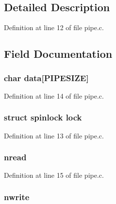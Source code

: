 \subsection{Detailed Description}


Definition at line 12 of file pipe.\-c.



\subsection{Field Documentation}
\hypertarget{structpipe_a4b9a650598bf6f6eff13ff36793ec4f4}{
\subsubsection[{data}]{\setlength{\rightskip}{0pt plus 5cm}char data\mbox{[}{\bf P\-I\-P\-E\-S\-I\-Z\-E}\mbox{]}}}\label{structpipe_a4b9a650598bf6f6eff13ff36793ec4f4}


Definition at line 14 of file pipe.\-c.

\hypertarget{structpipe_ab28e82cd5dda7d960095706a3ea20572}{
\subsubsection[{lock}]{\setlength{\rightskip}{0pt plus 5cm}struct {\bf spinlock} lock}}\label{structpipe_ab28e82cd5dda7d960095706a3ea20572}


Definition at line 13 of file pipe.\-c.

\hypertarget{structpipe_a0e346df9e608d0a7d2c8538f50ec39a7}{
\subsubsection[{nread}]{ nread}}\label{structpipe_a0e346df9e608d0a7d2c8538f50ec39a7}


Definition at line 15 of file pipe.\-c.

\hypertarget{structpipe_a089f1ec4d2ea845105344cd1121dd3ae}{
\subsubsection[{nwrite}]{ nwrite}}\label{structpipe_a089f1ec4d2ea845105344cd1121dd3ae}


